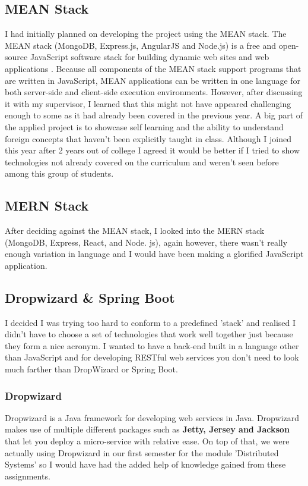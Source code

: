 \subsection{MEAN Stack}
I had initially planned on developing the project using the MEAN stack. The MEAN stack (MongoDB, Express.js, AngularJS and Node.js) is a free and open-source JavaScript software stack for building dynamic web sites and web applications \cite{mean}. Because all components of the MEAN stack support programs that are written in JavaScript, MEAN applications can be written in one language for both server-side and client-side execution environments. However, after discussing it with my supervisor, I learned that this might not have appeared challenging enough to some as it had already been covered in the previous year. A big part of the applied project is to showcase self learning and the ability to understand foreign concepts that haven't been explicitly taught in class. Although I joined this year after 2 years out of college I agreed it would be better if I tried to show technologies not already covered on the curriculum and weren't seen before among this group of students.

\subsection{MERN Stack}
After deciding against the MEAN stack, I looked into the MERN stack (MongoDB, Express, React, and Node. js), again however, there wasn't really enough variation in language and I would have been making a glorified JavaScript application.

\subsection{Dropwizard \& Spring Boot}
I decided I was trying too hard to conform to a predefined 'stack' and realised I didn't have to choose a set of technologies that work well together just because they form a nice acronym. I wanted to have a back-end built in a language other than JavaScript and for developing RESTful web services you don't need to look much farther than DropWizard or Spring Boot.

\subsubsection{Dropwizard}
Dropwizard is a Java framework for developing web services in Java. Dropwizard makes use of multiple different packages such as \textbf{Jetty, Jersey and Jackson} that let you deploy a micro-service with relative ease\cite{dropwizard}. On top of that, we were actually using Dropwizard in our first semester for the module 'Distributed Systems' so I would have had the added help of knowledge gained from these assignments.

